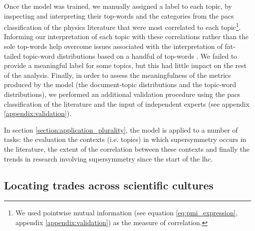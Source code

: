 \documentclass[smallextended]{svjour3}
\begin{document}
Once the model was trained, we manually assigned a label to each topic, by inspecting and interpreting their top-words and the categories from the \gls{pacs} classification of the physics literature that were most correlated to each topic\footnote{We used pointwise mutual information (see equation \ref{eq:pmi_expression}, appendix \ref{appendix:validation}) as the measure of correlation.}. Informing our interpretation of each topic with these correlations rather than the sole top-words help overcome issues associated with the interpretation of fat-tailed topic-word distributions based on a handful of top-words \citep{Chang2009,Allen2022}.  We failed to provide a meaningful label for some topics, but this had little impact on the rest of the analysis. Finally, in order to assess the meaningfulness of the metrics produced by the model (the document-topic distributions and the topic-word distributions), we performed an additional validation procedure using the \gls{pacs} classification of the literature and the input of independent experts (see appendix \ref{appendix:validation}). 

In section \ref{section:application_plurality}, the model is applied to a number of tasks: the evaluation the contexts (i.e. topics) in which supersymmetry occurs in the literature, the extent of the correlation between these contexts and finally the trends in research involving supersymmetry since the start of the \gls{lhc}.

\subsection{Locating trades across scientific cultures}\label{section:method_trading_zone}
\end{document}

